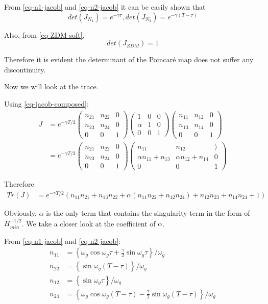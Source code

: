 \documentclass{book}
\renewcommand{\(}{\begin{columns}}
\renewcommand{\)}{\end{columns}}
\newcommand{\<}[1]{\begin{column}{#1}}
\renewcommand{\>}{\end{column}}
\begin{document}
From \eqref{eq-n1-jacob} and  \eqref{eq-n2-jacob}  it can be easily shown that 
\[
det(J_{N_1})=e^{-\gamma\tau}, det(J_{N_2})=e^{-\gamma(T-\tau)}
\]

Also, from \eqref{eq-ZDM-soft}, \[
det(J_{ZDM})=1
\]

Therefore it is evident the determinant of the Poincaré map does not suffer 
any discontinuity.  

Now we will look at the trace.  

Using \eqref{eq-jacob-composed}:
\begin{align}
\label{eq-ZDM-total}
J&=e^{-\gamma T/2}
\begin{pmatrix}
n_{21} & n_{22} & 0\\
n_{23} & n_{24} & 0\\
0 & 0 & 1
\end{pmatrix}
\begin{pmatrix}
1 & 0 & 0\\
\alpha & 1 & 0\\
0 & 0 & 1
\end{pmatrix}
\begin{pmatrix}
n_{11} & n_{12} & 0\\
n_{13} & n_{14} & 0\\
0 & 0 & 1
\end{pmatrix}\\
&=e^{-\gamma T/2}
\begin{pmatrix}
n_{21} & n_{22} & 0\\
n_{23} & n_{24} & 0\\
0 & 0 & 1
\end{pmatrix}
\begin{pmatrix}
n_{11} & n_{12} & )\\
\alpha n_{11}+n_{13} & \alpha n_{12}+n_{14} & 0\\
0 & 0 & 1
\end{pmatrix}
\end{align}

Therefore
\begin{align}
\label{eq-trace-ZDM}
Tr(J)&=e^{-\gamma T/2}(n_{11}n_{21}+n_{13}n_{22}+\alpha(n_{11}n_{22}+n_{12}n_{24})+n_{12}n_{23}+n_{14}n_{24}+1)
\end{align}

Obviously, $\alpha$ is the only term that contains the singularity term in the 
form of $H_{min}^{-1/2}$.  We take a closer look at the coefficient of $\alpha$.  

From \eqref{eq-n1-jacob} and \eqref{eq-n2-jacob}:
\begin{align}
n_{11}&=\left\{\omega_g\cos{\omega_g \tau}+\frac{\gamma}{2}\sin{\omega_g \tau} \right\}/\omega_g\\
n_{22}&=\left\{\sin{\omega_g (T-\tau)} \right\}/\omega_g\\
n_{12}&=\left\{\sin{\omega_g \tau} \right\}/\omega_g\\
n_{24}&=\left\{\omega_g\cos{\omega_g (T-\tau)}-\frac{\gamma}{2}\sin{\omega_g (T-\tau)} \right\}/\omega_g
\end{align}
\end{document}
